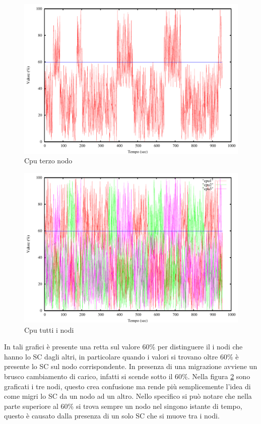 \begin{figure}[H]
\begin{center}
\includegraphics[scale=0.6]{etc/cpu3.pdf}
\caption{Cpu terzo nodo}
\label{fig:cpu3}
\end{center}
\end{figure}
\begin{figure}[H]
\begin{center}
\includegraphics[scale=0.6]{etc/cpu.pdf}
\caption{Cpu tutti i nodi}
\label{fig:cpu}
\end{center}
\end{figure}
In tali grafici è presente una retta sul valore 60\% per distinguere il i nodi che hanno lo SC dagli altri, in particolare quando i valori si trovano oltre 60\% è presente lo SC sul nodo corrispondente. In presenza di una migrazione avviene un brusco cambiamento di carico, infatti si scende sotto il 60\%. Nella figura \ref{fig:cpu} sono graficati i tre nodi, questo crea confusione ma rende più semplicemente l'idea di come migri lo SC da un nodo ad un altro. Nello specifico si può notare che nella parte superiore al 60\% si trova sempre un nodo nel singono istante di tempo, questo è causato dalla presenza di un solo SC che si muove tra i nodi.

